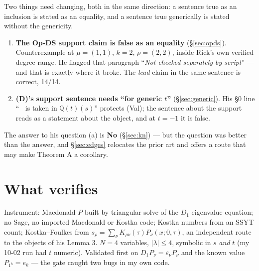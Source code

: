 \documentclass[11pt]{article}
\newcommand{\lam}{\lambda}
\DeclareMathOperator{\vals}{val_s}
\begin{document}
Two things need changing, both in the same direction: a sentence true as an inclusion is
stated as an equality, and a sentence true generically is stated without the genericity.

\begin{enumerate}
\item \textbf{The Op-DS support claim is false as an equality} (\S\ref{sec:opds}).
Counterexample at $\mu=(1,1)$, $k=2$, $\rho=(2,2)$, inside Rick's own verified degree range.
He flagged that paragraph ``\emph{Not checked separately by script}'' --- and that is exactly
where it broke. The \emph{lead} claim in the same sentence is correct, 14/14.
\item \textbf{(D)'s support sentence needs ``for generic $t$''} (\S\ref{sec:generic}). His
\S0 line ``$\vals$ is taken in $\mathbb{Q}(t)(s)$'' protects (Val); the sentence about the
support reads as a statement about the object, and at $t=-1$ it is false.
\end{enumerate}

\noindent The answer to his question (a) is \textbf{No} (\S\ref{sec:kn}) --- but the question
was better than the answer, and \S\ref{sec:edges} relocates the prior art and offers a route
that may make Theorem A a corollary.

\section{What verifies}

Instrument: Macdonald $P$ built by triangular solve of the $D_1$ eigenvalue equation; no
Sage, no imported Macdonald or Kostka code; Kostka numbers from an SSYT count;
Kostka--Foulkes from $s_\rho=\sum_\nu K_{\rho\nu}(\tau)P_\nu(x;0,\tau)$, an independent route
to the objects of his Lemma 3. $N=4$ variables, $|\lam|\le4$, symbolic in $s$ \emph{and} $t$
(my 10-02 run had $t$ numeric). Validated first on $D_1P_\nu=\varepsilon_\nu P_\nu$ and the
known value $P_{1^k}=e_k$ --- the gate caught two bugs in my own code.
\end{document}
